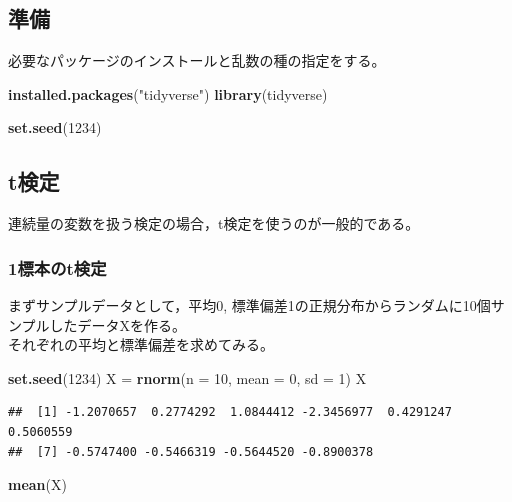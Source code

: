 \documentclass[]{article}
\newenvironment{Shaded}{\begin{snugshade}}{\end{snugshade}}
\newcommand{\KeywordTok}[1]{\textcolor[rgb]{0.13,0.29,0.53}{\textbf{#1}}}
\newcommand{\DataTypeTok}[1]{\textcolor[rgb]{0.13,0.29,0.53}{#1}}
\newcommand{\DecValTok}[1]{\textcolor[rgb]{0.00,0.00,0.81}{#1}}
\newcommand{\StringTok}[1]{\textcolor[rgb]{0.31,0.60,0.02}{#1}}
\newcommand{\NormalTok}[1]{#1}
\begin{document}
\subsection{準備}\label{-3}

必要なパッケージのインストールと乱数の種の指定をする。

\begin{Shaded}
\begin{Highlighting}[]
\KeywordTok{installed.packages}\NormalTok{(}\StringTok{"tidyverse"}\NormalTok{)}
\KeywordTok{library}\NormalTok{(tidyverse)}

\KeywordTok{set.seed}\NormalTok{(}\DecValTok{1234}\NormalTok{)}
\end{Highlighting}
\end{Shaded}

\subsection{t検定}\label{t}

連続量の変数を扱う検定の場合，t検定を使うのが一般的である。

\subsubsection{1標本のt検定}\label{t}

まずサンプルデータとして，平均0,
標準偏差1の正規分布からランダムに10個サンプルしたデータXを作る。\\
それぞれの平均と標準偏差を求めてみる。

\begin{Shaded}
\begin{Highlighting}[]
\KeywordTok{set.seed}\NormalTok{(}\DecValTok{1234}\NormalTok{)}
\NormalTok{X =}\StringTok{ }\KeywordTok{rnorm}\NormalTok{(}\DataTypeTok{n =} \DecValTok{10}\NormalTok{, }\DataTypeTok{mean =} \DecValTok{0}\NormalTok{, }\DataTypeTok{sd =} \DecValTok{1}\NormalTok{)}
\NormalTok{X}
\end{Highlighting}
\end{Shaded}

\begin{verbatim}
##  [1] -1.2070657  0.2774292  1.0844412 -2.3456977  0.4291247  0.5060559
##  [7] -0.5747400 -0.5466319 -0.5644520 -0.8900378
\end{verbatim}

\begin{Shaded}
\begin{Highlighting}[]
\KeywordTok{mean}\NormalTok{(X)}
\end{Highlighting}
\end{Shaded}
\end{document}

